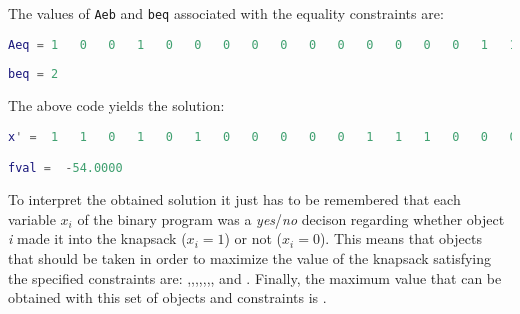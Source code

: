 The values of \texttt{Aeb} and \texttt{beq} associated with the equality constraints are:
\begin{lstlisting}[language=Matlab,frame=none]
Aeq = 1   0   0   1   0   0   0   0   0   0   0   0   0   0   0   1   1   1   0   0
     
beq = 2
\end{lstlisting}
 
The above code yields the solution:
\begin{lstlisting}[language=Matlab,frame=none]
x' =  1   1   0   1   0   1   0   0   0   0   0   1   1   1   0   0   0   0   1   1

fval =  -54.0000
\end{lstlisting}

To interpret the obtained solution it just has to be remembered that each variable $x_i$ of the binary program was a \textit{yes}/\textit{no} decison regarding whether object \textit{i} made it into the knapsack ($x_i=1$) or not ($x_i=0$). This means that objects that should be taken in order to maximize the value of the knapsack satisfying the specified constraints are: ,,,,,,, and . Finally, the maximum value that can be obtained with this set of objects and constraints is .\unboldmath 

    

